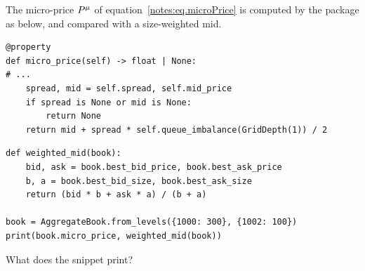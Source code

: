 \begin{question}
\label{question.microPriceTowardsTheThinSide}
The micro-price $P^{\mu}$ of equation~\eqref{notes:eq.microPrice}
is computed by the package as below,
and compared with a size-weighted mid.
\begin{lstlisting}[caption={\protect\codehl{unito26.lob.orderbook.AggregateBook}: the micro-price, its docstring elided.}, label=listing.microPriceProperty]
@property
def micro_price(self) -> float | None:
# ...
    spread, mid = self.spread, self.mid_price
    if spread is None or mid is None:
        return None
    return mid + spread * self.queue_imbalance(GridDepth(1)) / 2
\end{lstlisting}
\begin{lstlisting}[caption={A size-weighted mid, and the two compared}, label=listing.weightedMid]
def weighted_mid(book):
    bid, ask = book.best_bid_price, book.best_ask_price
    b, a = book.best_bid_size, book.best_ask_size
    return (bid * b + ask * a) / (b + a)

book = AggregateBook.from_levels({1000: 300}, {1002: 100})
print(book.micro_price, weighted_mid(book))
\end{lstlisting}
What does the snippet print?
\begin{choices}
 \correctchoice {}
 \choice {}
 \choice {}
 \choice {}
\end{choices}
\end{question}

